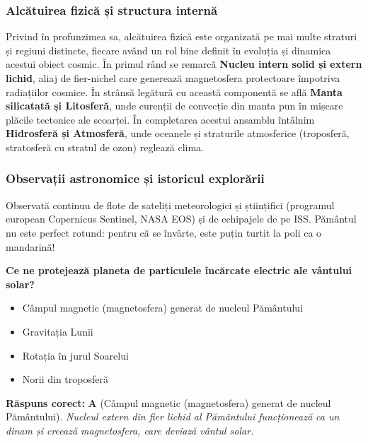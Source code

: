 \subsubsection*{Alcătuirea fizică și structura internă}
Privind în profunzimea sa, alcătuirea fizică este organizată pe mai multe straturi și regiuni distincte, fiecare având un rol bine definit în evoluția și dinamica acestui obiect cosmic. În primul rând se remarcă \textbf{Nucleu intern solid și extern lichid}, aliaj de fier-nichel care generează magnetosfera protectoare împotriva radiațiilor cosmice. În strânsă legătură cu această componentă se află \textbf{Manta silicatată și Litosferă}, unde curenții de convecție din manta pun în mișcare plăcile tectonice ale scoarței. În completarea acestui ansamblu întâlnim \textbf{Hidrosferă și Atmosferă}, unde oceanele și straturile atmosferice (troposferă, stratosferă cu stratul de ozon) reglează clima.

\subsubsection*{Observații astronomice și istoricul explorării}
Observată continuu de flote de sateliți meteorologici și științifici (programul european Copernicus Sentinel, NASA EOS) și de echipajele de pe ISS. Pământul nu este perfect rotund: pentru că se învârte, este puțin turtit la poli ca o mandarină!

\vspace{6pt}
\begin{tcolorbox}[orbitarquiz, title={\textbf{Întrebare de verificare \#4: Pământul}}]
\textbf{Ce ne protejează planeta de particulele încărcate electric ale vântului solar?}
\begin{itemize}[leftmargin=2.2em, itemsep=2pt, topsep=4pt]
  \item[$\square$ \textbf{A.}] Câmpul magnetic (magnetosfera) generat de nucleul Pământului
  \item[$\square$ \textbf{B.}] Gravitația Lunii
  \item[$\square$ \textbf{C.}] Rotația în jurul Soarelui
  \item[$\square$ \textbf{D.}] Norii din troposferă
\end{itemize}
\vspace{2pt}
{\footnotesize\color{orbitarMuted}\textbf{Răspuns corect:} \textbf{A} (Câmpul magnetic (magnetosfera) generat de nucleul Pământului). \emph{Nucleul extern din fier lichid al Pământului funcționează ca un dinam și creează magnetosfera, care deviază vântul solar.}}
\end{tcolorbox}
\clearpage


